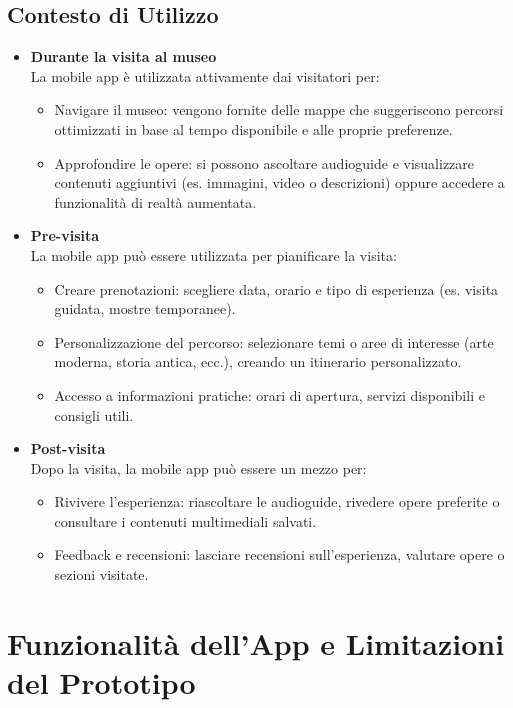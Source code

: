 \documentclass{article}
\begin{document}
\subsection{Contesto di Utilizzo}
\begin{itemize}

\item \textbf{Durante la visita al museo} \\
La mobile app è utilizzata attivamente dai visitatori per:
\begin{itemize}
\item Navigare il museo: vengono fornite delle mappe che suggeriscono percorsi ottimizzati in base al tempo disponibile e alle proprie preferenze.
\item Approfondire le opere: si possono ascoltare audioguide e visualizzare contenuti aggiuntivi (es. immagini, video o descrizioni) oppure accedere a funzionalità di realtà aumentata.
\end{itemize}

\item \textbf{Pre-visita} \\
La mobile app può essere utilizzata per pianificare la visita:
\begin{itemize}
\item Creare prenotazioni: scegliere data, orario e tipo di esperienza (es. visita guidata, mostre temporanee).
\item Personalizzazione del percorso: selezionare temi o aree di interesse (arte moderna, storia antica, ecc.), creando un itinerario personalizzato.
\item Accesso a informazioni pratiche: orari di apertura, servizi disponibili e consigli utili.
\end{itemize}

\item \textbf{Post-visita} \\
Dopo la visita, la mobile app può essere un mezzo per:
\begin{itemize}
\item Rivivere l’esperienza: riascoltare le audioguide, rivedere opere preferite o consultare i contenuti multimediali salvati.
\item Feedback e recensioni: lasciare recensioni sull’esperienza, valutare opere o sezioni visitate.
\end{itemize}

\end{itemize}

\section{Funzionalità dell'App e Limitazioni del Prototipo}
\end{document}

